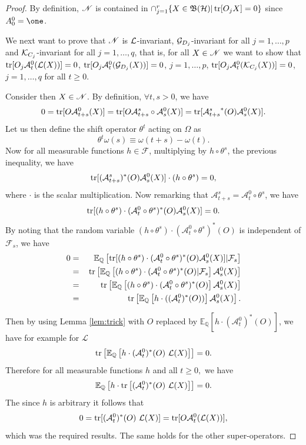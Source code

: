 \documentclass[aihp,12pt]{imsart}
\begin{document}
\begin{proof}
 By definition, $\mathscr{N}$ is contained in $\cap_{j=1}^r\{X\in\mathfrak{B}(\mathcal{H})|\, {\rm tr}[O_j X]=0\}$ since $A_{0}^0=\one$.

We next want to prove that $\mathscr{N}$ is $\mathcal{L}$-invariant, $\mathcal{G}_{D_j}$-invariant for all $j=1,\dots,p$ and $\mathcal{K}_{C_j}$-invariant for all $j=1,\dots,q$, that is, for all $X\in\mathscr{N}$ we want to show that ${\rm tr}[O_j\mathcal A_t^0(\mathcal{L}(X))]=0$, ${\rm tr}[O_j\mathcal A_t^0(\mathcal{G}_{D_j}(X))]=0$, $j=1,\ldots,p$, ${\rm tr}[O_j\mathcal A_t^0(\mathcal{K}_{C_j}(X))]=0$, $j=1,\ldots,q$  for all $t\geq0$.

Consider then $X\in\mathscr{N}$. By definition, $\forall t,s>0$,  we have 
    \begin{eqnarray*}
    0={\rm tr}[O \mathcal A_{t+s}^0(X)]
    ={\rm tr}[O \mathcal A_{t+s}^s\circ{\mathcal A_s^0}(X)]
    ={\rm tr}[{\mathcal A_{t+s}^s}^* (O){\mathcal A_s^0}(X)].
    \end{eqnarray*} 
Let us then define the shift operator $\theta^t$ acting on $\Omega$ as
$$\theta^t\omega(s)\equiv\omega(t+s)-\omega(t).$$
Now for all measurable functions $h\in\mathcal F$, multiplying by $h\circ \theta^s$, the previous inequality, we have
   $${\rm tr}[{(\mathcal A_{t+s}^s})^* (O){\mathcal A_s^0}(X)]\cdot(h\circ \theta^s)=0,$$
where $\cdot$ is the scalar multiplication.
Now remarking that $\mathcal A_{t+s}^s=\mathcal A_t^0\circ\theta^s$, we have
$${\rm tr}[(h\circ \theta^s)\cdot({\mathcal A_t^0\circ\theta^s})^* (O)  {\mathcal A_s^0}(X)]=0.$$
By noting that the random variable $(h\circ \theta^s)\cdot({\mathcal A_t^0\circ\theta^s})^* (O)$  is independent of $\mathcal F_s$, we have
\begin{eqnarray*}
0&=\,&\mathbb E_{\mathbb Q}\left[{\rm tr}[(h\circ \theta^s)\cdot({\mathcal A_t^0\circ\theta^s})^* (O) {\mathcal A_s^0}(X)]\vert\mathcal F_s\right]\\
&=\,&{\rm tr}\left[\mathbb E_{\mathbb Q}\left[(h\circ \theta^s)\cdot({\mathcal A_t^0\circ\theta^s})^* (O)\vert \mathcal F_s\right] {\mathcal A_s^0}(X)\right]\\
&=\,&{\rm tr}\left[\mathbb E_{\mathbb Q}\left[(h\circ \theta^s)\cdot({\mathcal A_t^0\circ\theta^s})^* (O)\right] {\mathcal A_s^0}(X)\right]\\
&=\,& {\rm tr}\left[\mathbb E_{\mathbb Q}\left[h\cdot(({\mathcal A_t^0})^* (O))\right] {\mathcal A_s^0}(X)\right].
\end{eqnarray*}

Then by using Lemma \ref{lem:trick} with $O$ replaced by $\mathbb E_{\mathbb Q}\left[h\cdot({\mathcal A_t^0})^* (O)\right]$, we have for example for $\mathcal L$
$${\rm tr}\left[\mathbb E_{\mathbb Q}\left[h\cdot({\mathcal A_t^0})^* (O)\,\,\mathcal L(X)\right]\right]=0.$$
Therefore for all measurable functions $h$ and all $t\geq 0,$ we have
$$\mathbb E_{\mathbb Q}\left[h\cdot{\rm tr}\left[({\mathcal A_t^0})^* (O)\,\,\mathcal L(X)\right]\right]=0.$$
The since $h$ is arbitrary it follows that
$$0={\rm tr}[({\mathcal A_t^0})^* (O)\,\,\mathcal L(X)]={\rm tr}[O\mathcal A_t^0 (\mathcal L(X))],$$
which was the required results. The same holds for the other super-operators.


\end{proof}
\end{document}
